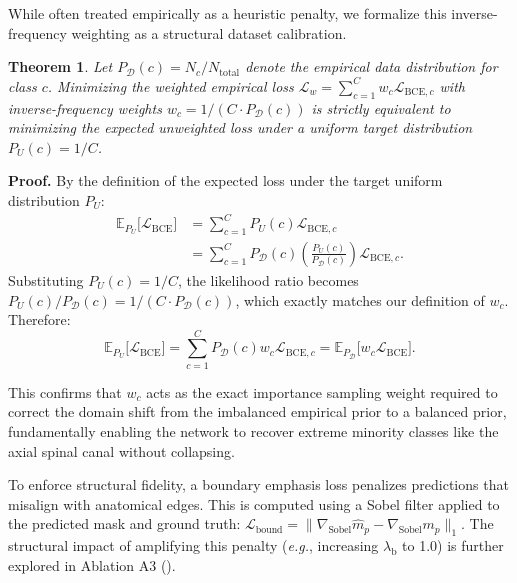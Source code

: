 \documentclass[journal]{IEEEtran}
\makeatletter
\newtheorem{theorem}{Theorem}[section]
\newcommand{\eg}{\textit{e.g.}\@\xspace}
\makeatother
\begin{document}
While often treated empirically as a heuristic penalty, we formalize this inverse-frequency weighting as a structural dataset calibration.

\begin{theorem}
\label{thm:weighting}
Let $P_{\mathcal{D}}(c) = N_c/N_\text{total}$ denote the empirical data distribution for class $c$. Minimizing the weighted empirical loss $\mathcal{L}_w = \sum_{c=1}^{C} w_c \mathcal{L}_{\mathrm{BCE},c}$ with inverse-frequency weights $w_c = 1/(C \cdot P_{\mathcal{D}}(c))$ is strictly equivalent to minimizing the expected unweighted loss under a uniform target distribution $P_U(c) = 1/C$.
\end{theorem}

\textbf{Proof.}
By the definition of the expected loss under the target uniform distribution $P_U$:
\begin{align}
    \mathbb{E}_{P_U}\bigl[\mathcal{L}_{\mathrm{BCE}}\bigr] 
    &= \sum_{c=1}^{C} P_U(c) \mathcal{L}_{\mathrm{BCE},c} \nonumber \\
    &= \sum_{c=1}^{C} P_{\mathcal{D}}(c) \left( \frac{P_U(c)}{P_{\mathcal{D}}(c)} \right) \mathcal{L}_{\mathrm{BCE},c}.
\end{align}
Substituting $P_U(c) = 1/C$, the likelihood ratio becomes $P_U(c)/P_{\mathcal{D}}(c) = 1/(C \cdot P_{\mathcal{D}}(c))$, which exactly matches our definition of $w_c$. Therefore:
\begin{equation}
    \mathbb{E}_{P_U}\bigl[\mathcal{L}_{\mathrm{BCE}}\bigr] = \sum_{c=1}^{C} P_{\mathcal{D}}(c) w_c \mathcal{L}_{\mathrm{BCE},c} = \mathbb{E}_{P_{\mathcal{D}}}\bigl[w_c \mathcal{L}_{\mathrm{BCE}}\bigr].
\end{equation}

This confirms that $w_c$ acts as the exact importance sampling weight required to correct the domain shift from the imbalanced empirical prior to a balanced prior, fundamentally enabling the network to recover extreme minority classes like the axial spinal canal without collapsing.

To enforce structural fidelity, a boundary emphasis loss penalizes predictions that misalign with anatomical edges. This is computed using a Sobel filter applied to the predicted mask and ground truth: $\mathcal{L}_\text{bound} = \|\nabla_{\text{Sobel}} \hat{m}_p - \nabla_{\text{Sobel}} m_p\|_1$. The structural impact of amplifying this penalty (\eg, increasing $\lambda_\text{b}$ to 1.0) is further explored in Ablation A3 ().
\end{document}
